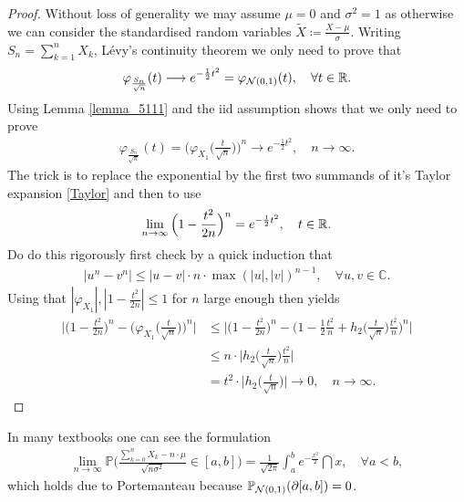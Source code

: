 \begin{proof}[Proof]
	Without loss of generality we may assume $\mu=0$ and $\sigma^2=1$ as otherwise we can consider the standardised random variables $\tilde{X} \coloneqq \frac{X-\mu}{\sigma}$. Writing $S_n=\sum_{k=1}^n X_k$, L\'{e}vy's continuity theorem we only need to prove that
	\begin{align*}
		\varphi_{\frac{S_n}{\sqrt{n}}}(t) \longrightarrow e^{-\frac{1}{2}t^2} = \varphi_{\mathcal{N}(0,1)}(t),\quad \forall t \in \mathbb{R}.
	\end{align*}
	Using Lemma \ref{lemma_5111} and the iid assumption shows that we only need to prove
	\begin{align*}
		\varphi_{\frac{S_n}{\sqrt{n}}}(t) = \Big( \varphi_{X_1}\Big( \frac{t}{\sqrt{n}}\Big) \Big)^n \longrightarrow e^{-\frac{1}{2}t^2}, \quad n \to \infty.
	\end{align*}	
The trick is to replace the exponential by the first two summands of it's Taylor expansion \eqref{Taylor} and then to use
\begin{align*}
	\lim_{n\to\infty}\Big(1-  \frac{t^2}{2n}\Big)^{n}= e^{-\frac{1}{2}t^2},\quad t\in\mathbb{R}.
\end{align*}
Do do this rigorously first check by a quick induction that
	\begin{align*}
		\lvert u^n - v^n \rvert \leq \lvert u - v \rvert \cdot n \cdot \max(\lvert u \rvert, \lvert v \rvert )^{n-1}, \quad\forall u,v\in\mathbb{C}.
	\end{align*}
	Using that $|\varphi_{X_1}|, |1 - \frac{t^2}{2n}|\leq 1$ for $n$ large enough then yields
	\begin{align*}
		\bigg\lvert \Big( 1 - \frac{t^2}{2n} \Big)^n - \Big(\varphi_{ X_1}\big(\frac{t}{\sqrt{n}}\big)\Big)^n \bigg\rvert 
		&\leq \bigg\lvert \Big( 1 - \frac{t^2}{2n} \Big)^n - \Big( 1 - \frac{1}{2} \frac{t^2}{n} + h_2\Big( \frac{t}{\sqrt{n}} \Big) \frac{t^2}{n} \Big)^n \bigg\rvert \\
		&\leq n \cdot \Big\lvert h_2 \Big( \frac{t}{\sqrt{n}}\Big)  \frac{t^2}{n} \Big\rvert \\
		&= t^2 \cdot \Big\lvert h_2 \Big( \frac{t}{\sqrt{n}} \Big) \Big\rvert
		\rightarrow 0,\quad n \to \infty.
	\end{align*}
\end{proof}
In many textbooks one can see the formulation
	\begin{align*}
		\lim_{n\to\infty}\mathbb{P} \bigg( \frac{\sum_{k=0}^n X_k - n \cdot \mu}{\sqrt{n \sigma^2}} \in [a,b] \bigg)= \frac{1}{\sqrt{2\pi}} \int_a^b e^{- \frac{x^2}{2}} \dint x, \quad \forall a<b,
	\end{align*}
	which holds due to Portemanteau because $\mathbb{P}_{\mathcal{N}(0,1)}( \partial [a,b]) = 0$.\smallskip

